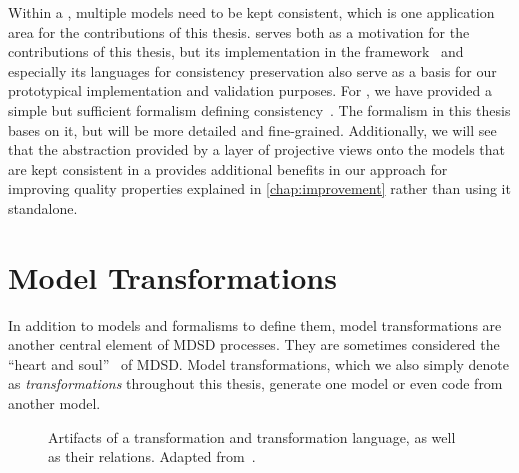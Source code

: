 Within a \vsum, multiple models need to be kept consistent, which is one application area for the contributions of this thesis.
\vitruv serves both as a motivation for the contributions of this thesis, but its implementation in the \vitruv framework~ and especially its languages for consistency preservation also serve as a basis for our prototypical implementation and validation purposes.
For \vitruv, we have provided a simple but sufficient formalism defining consistency~.
The formalism in this thesis bases on it, but will be more detailed and fine-grained.
Additionally, we will see that the abstraction provided by a layer of projective views onto the models that are kept consistent in a \vsum provides additional benefits in our approach for improving quality properties explained in \autoref{chap:improvement} rather than using it standalone.


\section{Model Transformations}
\label{chap:foundations:transformations}

In addition to models and formalisms to define them, model transformations are another central element of \gls{MDSD} processes.
They are sometimes considered the \enquote{heart and soul}~\cite{sendall2003modelTransformation-Software} of \gls{MDSD}.
Model transformations, which we also simply denote as \emph{transformations} throughout this thesis, generate one model or even code from another model.

\begin{figure}
    \centering
    
    \caption[Transformation artifacts and their relations]{Artifacts of a transformation and transformation language, as well as their relations. Adapted from~\cite[Fig.~9-5]{kleppe2003mdaExplained-Book}.}
    \label{fig:foundations:transformation}
\end{figure}

